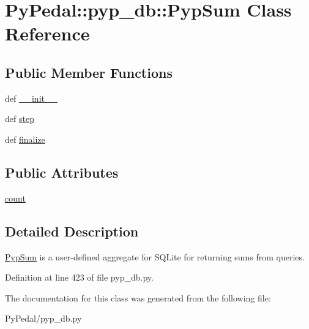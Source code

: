 \hypertarget{classPyPedal_1_1pyp__db_1_1PypSum}{
\section{PyPedal::pyp\_\-db::PypSum Class Reference}
\label{classPyPedal_1_1pyp__db_1_1PypSum}
}
\subsection*{Public Member Functions}
\begin{CompactItemize}
\item 
\hypertarget{classPyPedal_1_1pyp__db_1_1PypSum_6fee8a8493aa28aeaf77d822ec9551d2}{
def \hyperlink{classPyPedal_1_1pyp__db_1_1PypSum_6fee8a8493aa28aeaf77d822ec9551d2}{\_\-\_\-init\_\-\_\-}}
\label{classPyPedal_1_1pyp__db_1_1PypSum_6fee8a8493aa28aeaf77d822ec9551d2}

\item 
\hypertarget{classPyPedal_1_1pyp__db_1_1PypSum_3fb13a6de0fe5ddcec74fb8d1851de89}{
def \hyperlink{classPyPedal_1_1pyp__db_1_1PypSum_3fb13a6de0fe5ddcec74fb8d1851de89}{step}}
\label{classPyPedal_1_1pyp__db_1_1PypSum_3fb13a6de0fe5ddcec74fb8d1851de89}

\item 
\hypertarget{classPyPedal_1_1pyp__db_1_1PypSum_10e36a19a931ea6204477ddf64d72e97}{
def \hyperlink{classPyPedal_1_1pyp__db_1_1PypSum_10e36a19a931ea6204477ddf64d72e97}{finalize}}
\label{classPyPedal_1_1pyp__db_1_1PypSum_10e36a19a931ea6204477ddf64d72e97}

\end{CompactItemize}
\subsection*{Public Attributes}
\begin{CompactItemize}
\item 
\hypertarget{classPyPedal_1_1pyp__db_1_1PypSum_923a4e814827b671b0ba75861dba7d08}{
\hyperlink{classPyPedal_1_1pyp__db_1_1PypSum_923a4e814827b671b0ba75861dba7d08}{count}}
\label{classPyPedal_1_1pyp__db_1_1PypSum_923a4e814827b671b0ba75861dba7d08}

\end{CompactItemize}


\subsection{Detailed Description}
\hyperlink{classPyPedal_1_1pyp__db_1_1PypSum}{PypSum} is a user-defined aggregate for SQLite for returning sums from queries. 

Definition at line 423 of file pyp\_\-db.py.

The documentation for this class was generated from the following file:\begin{CompactItemize}
\item 
PyPedal/pyp\_\-db.py\end{CompactItemize}
